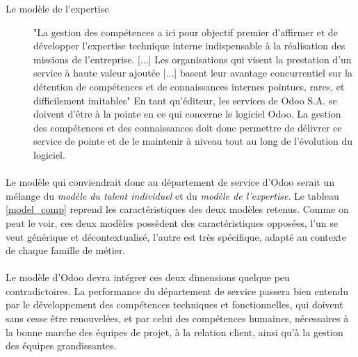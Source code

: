 \begin{description}
  \item[Le modèle de l'expertise]
  "La gestion des compétences a ici pour objectif premier d'affirmer et de développer l'expertise technique interne indispensable à la réalisation des missions de l'entreprise. [...] Les organisations qui visent la prestation d'un service à haute valeur ajoutée [...] basent leur avantage concurrentiel sur la détention de compétences et de connaissances internes pointues, rares, et difficilement imitables"\citep[pp.45]{delobbe} En tant qu'éditeur, les services de Odoo S.A. se doivent d'être à la pointe en ce qui concerne le logiciel Odoo. La gestion des compétences et des connaissances doit donc permettre de délivrer ce service de pointe et de le maintenir à niveau tout au long de l'évolution du logiciel. 
\end{description}


\paragraph{}Le modèle qui conviendrait donc au département de service d'Odoo serait un mélange du \textit{modèle du talent individuel} et du \textit{modèle de l'expertise}. Le tableau \ref{model_comp} reprend les caractéristiques des deux modèles retenus. Comme on peut le voir, ces deux modèles possèdent des caractéristiques opposées, l'un se veut générique et décontextualisé, l'autre est très spécifique, adapté au contexte de chaque famille de métier. 

\paragraph{}Le modèle d'Odoo devra intégrer ces deux dimensions quelque peu contradictoires.
La performance du département de service passera bien entendu par le développement des compétences techniques et fonctionnelles, qui doivent sans cesse être renouvelées, et par celui des compétences humaines, nécessaires à la bonne marche des équipes de projet, à la relation client, ainsi qu'à la gestion des équipes grandissantes.



